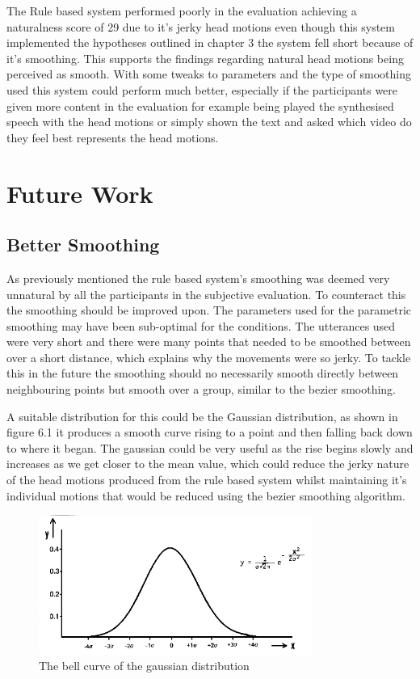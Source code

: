 \documentclass[bsc,frontabs,twoside,singlespacing,parskip]{infthesis}
\begin{document}
The Rule based system performed poorly in the evaluation achieving a naturalness score of 29 due to it's jerky head motions even though this system implemented the hypotheses outlined in chapter 3 the system fell short because of it's smoothing. This supports the findings regarding natural head motions being perceived as smooth. With some tweaks to parameters and the type of smoothing used this system could perform much better, especially if the participants were given more content in the evaluation for example being played the synthesised speech with the head motions or simply shown the text and asked which video do they feel best represents the head motions.

\section{Future Work}

\subsection{Better Smoothing}

As previously mentioned the rule based system's smoothing was deemed very unnatural by all the participants in the subjective evaluation. To counteract this the smoothing should be improved upon. The parameters used for the parametric smoothing may have been sub-optimal for the conditions. The utterances used were very short and there were many points that needed to be smoothed between over a short distance, which explains why the movements were so jerky. To tackle this in the future the smoothing should no necessarily smooth directly between neighbouring points but smooth over a group, similar to the bezier smoothing. 

A suitable distribution for this could be the Gaussian distribution, as shown in figure 6.1 it produces a smooth curve rising to a point and then falling back down to where it began. The gaussian could be very useful as the rise begins slowly and increases as we get closer to the mean value, which could reduce the jerky nature of the head motions produced from the rule based system whilst maintaining it's individual motions that would be reduced using the bezier smoothing algorithm.

\begin{figure}
	\centering
	\includegraphics[width=0.8\textwidth]{gaussian.png}
	\caption{The bell curve of the gaussian distribution}
\end{figure}
\end{document}
